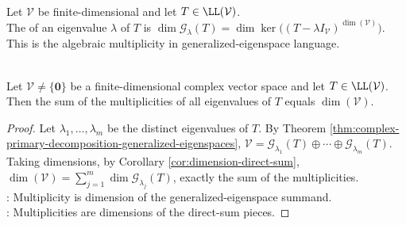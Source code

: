 \begin{definition} \label{def:eigenvalue-multiplicity-generalized-eigenspace} \\
Let $\mathcal{V}$ be finite-dimensional and let $T\in\LL(\mathcal{V})$.\\
The  of an eigenvalue $\lambda$ of $T$ is $\dim \mathcal{G}_{\lambda}(T)=\dim\ker\bigl((T-\lambda I_{\mathcal{V}})^{\dim(\mathcal{V})}\bigr)$.\\
This is the algebraic multiplicity in generalized-eigenspace language.
\end{definition}

\begin{proposition} \label{prop:sum-of-complex-eigenvalue-multiplicities} \\
Let $\mathcal{V}\neq\{\mathbf{0}\}$ be a finite-dimensional complex vector space and let $T\in\LL(\mathcal{V})$. Then the sum of the multiplicities of all eigenvalues of $T$ equals $\dim(\mathcal{V})$.
\begin{proof}
Let $\lambda_1,\ldots,\lambda_m$ be the distinct eigenvalues of $T$. By Theorem \ref{thm:complex-primary-decomposition-generalized-eigenspaces}, $\mathcal{V}=\mathcal{G}_{\lambda_1}(T)\oplus\cdots\oplus \mathcal{G}_{\lambda_m}(T)$.\\
Taking dimensions, by Corollary \ref{cor:dimension-direct-sum}, $\dim(\mathcal{V})=\sum\limits_{j=1}^{m}\dim \mathcal{G}_{\lambda_j}(T)$, exactly the sum of the multiplicities.\\
: Multiplicity is dimension of the generalized-eigenspace summand.\\
: Multiplicities are dimensions of the direct-sum pieces.
\end{proof}
\end{proposition}

